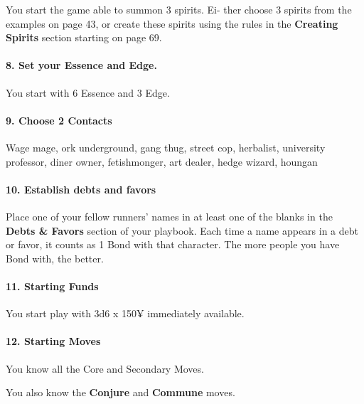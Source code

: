 \begin{multicols}{3}
You start the game able to summon 3 spirits. Ei-
ther choose 3 spirits from the examples on page
43, or create these spirits using the rules in the
\textbf{Creating Spirits} section starting on page 69.

\paragraph{8.  Set your Essence and Edge.}

You start with 6 Essence and 3 Edge.

\paragraph{9.  Choose 2 Contacts}

Wage mage, ork underground, gang thug, street
cop, herbalist, university professor, diner owner,
fetishmonger, art dealer, hedge wizard, houngan

\paragraph{10.  Establish debts and favors}

Place one of your fellow runners’ names in at
least one of the blanks in the \textbf{Debts \& Favors}
section of your playbook. Each time a name
appears in a debt or favor, it counts as 1 Bond
with that character. The more people you have
Bond with, the better.

\paragraph{11.  Starting Funds}

You start play with 3d6 x 150¥ immediately
available.

\paragraph{12.  Starting Moves}

You know all the Core and Secondary Moves.

You also know the \textbf{Conjure} and
\textbf{Commune} moves.

\end{multicols}

\newpage


